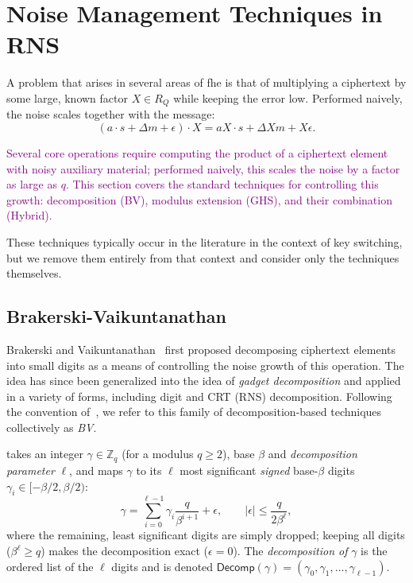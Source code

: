 \section{Noise Management Techniques in RNS}
\label{sec:gadgets}
A problem that arises in several areas of \gls{fhe} is that of multiplying a ciphertext by some large, known factor $X\in R_Q$ while keeping the error low. Performed naively, the noise scales together with the message:
\begin{equation}
    (a\cdot s + \Delta m + \epsilon) \cdot X = aX\cdot s + \Delta Xm + X\epsilon.
\end{equation}

\textcolor{purple}{
Several core operations require computing the product of a ciphertext element with noisy auxiliary material; performed naively, this scales the noise by a factor as large as $q$. This section covers the standard techniques for controlling this growth: decomposition (BV), modulus extension (GHS), and their combination (Hybrid).
}

These techniques typically occur in the literature in the context of key switching, but we remove them entirely from that context and consider only the techniques themselves.

\subsection{Brakerski-Vaikuntanathan}
Brakerski and Vaikuntanathan~\cite{cryptoeprint:2011/344} first proposed decomposing ciphertext elements into small digits as a means of controlling the noise growth of this operation. The idea has since been generalized into the idea of \emph{gadget decomposition} and applied in a variety of forms, including digit and CRT (RNS) decomposition. Following the convention of~\cite{cryptoeprint:2021/204, cryptoeprint:2022/915}, we refer to this family of decomposition-based techniques collectively as \emph{BV}.


\begin{definition}
    \label{ex:radix_gadget}
    takes an integer $\gamma\in\mathbb{Z}_q$ (for a modulus $q\geq 2$), base $\beta$ and \textit{decomposition parameter} $\ell$, and maps $\gamma$ to its $\ell$ most significant \textit{signed} base-$\beta$ digits $\gamma_i \in [-\beta/2, \beta/2)$:
    \begin{equation}
        \gamma = \sum_{i=0}^{\ell-1}\gamma_i\frac{q}{\beta^{i+1}} + \epsilon, \qquad |\epsilon| \leq \frac{q}{2\beta^{\ell}},
    \end{equation}
    where the remaining, least significant digits are simply dropped; keeping all digits ($\beta^\ell \geq q$) makes the decomposition exact ($\epsilon = 0$). The \textit{decomposition of} $\mathit{\gamma}$ is the ordered list of the $\ell$ digits and is denoted $\mathsf{Decomp}(\gamma) = (\gamma_0, \gamma_1, \dots, \gamma_{\ell-1})$.
\end{definition}

